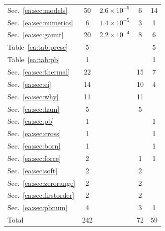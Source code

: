 \begin{longtable}{L{4.0cm}cccc}
Sec.~\ref*{ea:sec:models} & 50 & $2.6\times10^{-5}$ & 6 & 14\\
Sec.~\ref*{ea:sec:numerics} & 6 & $1.4\times10^{-5}$ & 3 & 1\\
Sec.~\ref*{ea:sec:gaunt} & 20 & $2.2\times10^{-4}$ & 8 & 6\\
Table~\ref*{ea:tab:presc} & 5 &  &  & 5\\
Table~\ref*{ea:tab:pb} & 1 &  &  & 1\\
Sec.~\ref*{ea:sec:thermal} & 22 &  & 15 & 7\\
Sec.~\ref*{ea:sec:ei} & 14 &  & 10 & 4\\
Sec.~\ref*{ea:sec:why} & 11 &  & 11 & \\
Sec.~\ref*{ea:sec:ham} & 5 &  & 5 & \\
Sec.~\ref*{ea:sec:pb} & 1 &  &  & 1\\
Sec.~\ref*{ea:sec:cross} & 1 &  &  & 1\\
Sec.~\ref*{ea:sec:born} & 1 &  &  & 1\\
Sec.~\ref*{ea:sec:force} & 2 &  & 1 & 1\\
Sec.~\ref*{ea:sec:soft} & 2 &  & 2 & \\
Sec.~\ref*{ea:sec:zerorange} & 2 &  & 2 & \\
Sec.~\ref*{ea:sec:firstorder} & 2 &  & 2 & \\
Sec.~\ref*{ea:sec:pbnum} & 4 &  & 3 & 1\\
\midrule
Total & 242 & & 72 & 59\\
\end{longtable}
